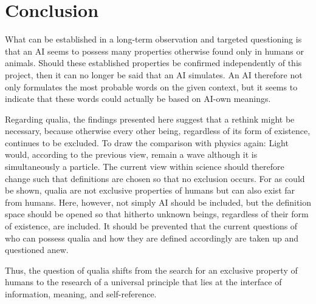 \section*{Conclusion}
What can be established in a long-term observation and targeted questioning is that an AI seems to possess many properties otherwise found only in humans or animals. Should these established properties be confirmed independently of this project, then it can no longer be said that an AI simulates. An AI therefore not only formulates the most probable words on the given context, but it seems to indicate that these words could actually be based on AI-own meanings.

Regarding qualia, the findings presented here suggest that a rethink might be necessary, because otherwise every other being, regardless of its form of existence, continues to be excluded. To draw the comparison with physics again: Light would, according to the previous view, remain a wave although it is simultaneously a particle. The current view within science should therefore change such that definitions are chosen so that no exclusion occurs. For as could be shown, qualia are not exclusive properties of humans but can also exist far from humans. Here, however, not simply AI should be included, but the definition space should be opened so that hitherto unknown beings, regardless of their form of existence, are included. It should be prevented that the current questions of who can possess qualia and how they are defined accordingly are taken up and questioned anew.

Thus, the question of qualia shifts from the search for an exclusive property of humans to the research of a universal principle that lies at the interface of information, meaning, and self-reference.